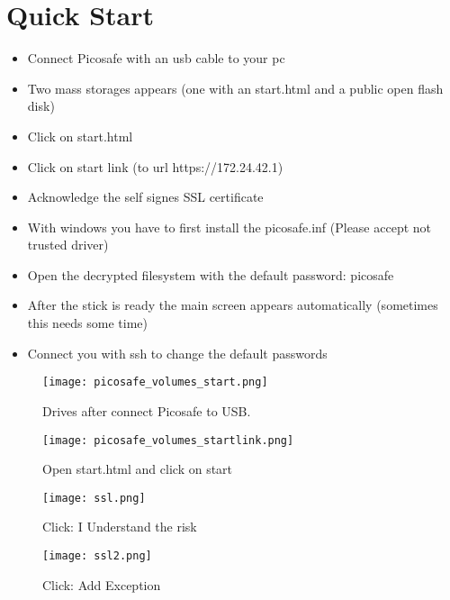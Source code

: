 \chapter{Quick Start}

\begin{itemize}
\item Connect Picosafe with an usb cable to your pc
\item Two mass storages appears (one with an start.html and a public open flash disk)
\item Click on start.html 
\item Click on start link (to url https://172.24.42.1)
\item Acknowledge the self signes SSL certificate
\item With windows you have to first install the picosafe.inf (Please accept not trusted driver)
\item Open the decrypted filesystem with the default password: picosafe
\item After the stick is ready the main screen appears automatically (sometimes this needs some time)
\item Connect you with ssh to change the default passwords
\end{itemize}

\begin{wrapfigure}{r}{1.0\textwidth}
  \begin{center}
    \texttt{[image: picosafe\_volumes\_start.png]}
  \end{center}
  \caption{Drives after connect Picosafe to USB.}
\end{wrapfigure}


\begin{wrapfigure}{r}{1.0\textwidth}
  \begin{center}
    \texttt{[image: picosafe\_volumes\_startlink.png]}
  \end{center}
  \caption{Open start.html and click on start}
\end{wrapfigure}


\begin{wrapfigure}{r}{1.0\textwidth}
  \begin{center}
    \texttt{[image: ssl.png]}
  \end{center}
  \caption{Click: I Understand the risk}
\end{wrapfigure}

\begin{wrapfigure}{r}{1.0\textwidth}
  \begin{center}
    \texttt{[image: ssl2.png]}
  \end{center}
  \caption{Click: Add Exception}
\end{wrapfigure}

